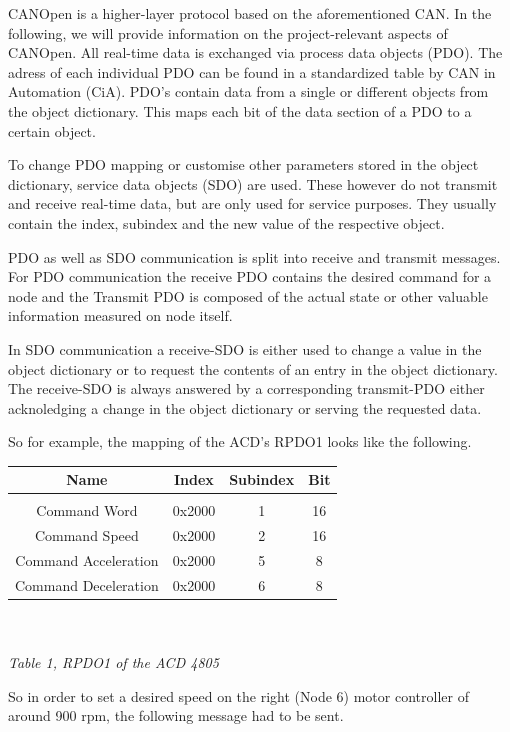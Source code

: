 CANOpen is a higher-layer protocol based on the aforementioned CAN. In the following, we will provide information on the project-relevant aspects of CANOpen.
All real-time data is exchanged via process data objects (PDO). The adress of each individual PDO can be found in a standardized table by CAN in Automation (CiA). PDO's contain data from a single or different objects from the object dictionary. This maps each bit of the data section of a PDO to a certain object.

To change PDO mapping or customise other parameters stored in the object dictionary, service data objects (SDO) are used. These however do not transmit and receive real-time data, but are only used for service purposes. They usually contain the index, subindex and the new value of the respective object.

PDO as well as SDO communication is split into receive and transmit messages.
 For PDO communication the receive PDO contains the desired command for a node and the Transmit PDO is composed of the actual state or other valuable information measured on node itself.

In SDO communication a receive-SDO is either used to change a value in the object dictionary or to request the contents of an entry in the object dictionary. The receive-SDO is always answered by a corresponding transmit-PDO either acknoledging a change in the object dictionary or serving the requested data.

So for example, the mapping of the ACD's RPDO1 looks like the following.

\begin{tabular}{|c|c|c|c|}
	\hline 
	Name & Index & Subindex & Bit \\ 
	\hline 
	&  &  &  \\ 
	\hline 
	Command Word & 0x2000 & 1 & 16 \\ 
	\hline 
	Command Speed & 0x2000 & 2 & 16 \\ 
	\hline 
	Command Acceleration & 0x2000 & 5 & 8 \\ 
	\hline 
	Command Deceleration & 0x2000 & 6 & 8 \\ 
	\hline 
\end{tabular} 
\\
\\
\textit{Table 1, RPDO1 of the ACD 4805}

So in order to set a desired speed on the right (Node 6) motor controller of around 900 rpm, the following message had to be sent.


